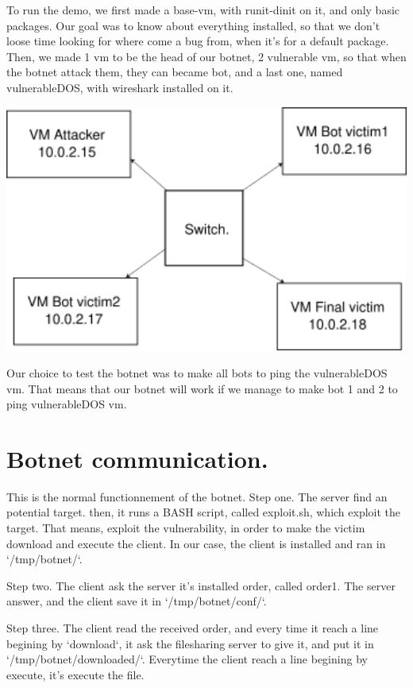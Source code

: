 \documentclass[../main.tex]{subfiles}
\begin{document}
    To run the demo, we first made a base-vm, with runit-dinit on it, and only basic packages.
    Our goal was to know about everything installed, so that we don't loose time looking for where come a bug from, when it's for a default package.
    Then, we made 1 vm to be the head of our botnet, 2 vulnerable vm, so that when the botnet attack them, they can became bot, and a last one, named vulnerableDOS, with wireshark installed on it.

    \includegraphics[width=450pt]{lab_env.png}

    Our choice to test the botnet was to make all bots to ping the vulnerableDOS vm.
    That means that our botnet will work if we manage to make bot 1 and 2 to ping vulnerableDOS vm.


    \vspace{10pt}

    \section{Botnet communication.}

    This is the normal functionnement of the botnet.
    Step one. 
    The server find an potential target.
    then, it runs a BASH script, called exploit.sh, which exploit the target.
    That means, exploit the vulnerability, in order to make the victim download and execute the client.
    In our case, the client is installed and ran in `/tmp/botnet/`.

    Step two.
    The client ask the server it's installed order, called order1.
    The server answer, and the client save it in `/tmp/botnet/conf/`.

    Step three.
    The client read the received order, and every time it reach a line begining by `download`, it ask the filesharing server to give it, and put it in `/tmp/botnet/downloaded/`.
    Everytime the client reach a line begining by execute, it's execute the file.
\end{document}
